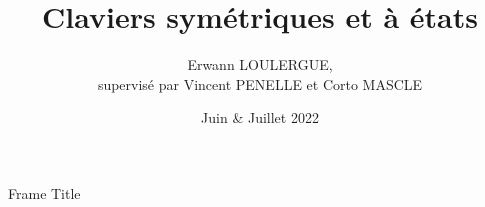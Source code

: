 \documentclass{beamer}
\title{Claviers symétriques et à états}
\author{Erwann LOULERGUE, \texorpdfstring{\\ supervisé par Vincent PENELLE et Corto MASCLE}{}}
\date{Juin \& Juillet 2022}
\begin{document}
\begin{frame}[plain]
    \maketitle
\end{frame}

\begin{frame}{Frame Title}
\end{frame}
\end{document}
